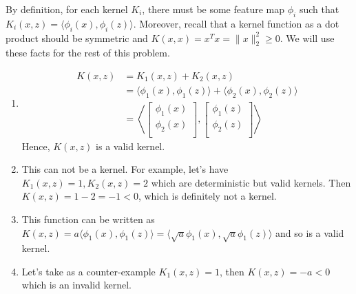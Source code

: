 \begin{answer}
By definition, for each kernel $K_i$, there must be some feature map $\phi_i$ 
such that $K_i(x, z) = \langle \phi_i (x), \phi_i (z) \rangle$. Moreover, 
recall that a kernel function as a dot product should be symmetric and $K(x,x) 
= x^{T}x = \|x\|_{2}^{2} \ge 0$. We will use these facts for the rest of this 
problem. 
\begin{enumerate}
\item 
\begin{align}
	K(x, z) 
	&= K_{1}(x, z) + K_{2}(x, z) \\
	&= \langle \phi_{1}(x), \phi_{1}(z) \rangle + \langle \phi_{2}(x), 
	\phi_{2}(z) \rangle \\
	&= \left\langle \begin{bmatrix}
		\phi_{1}(x) \\
		\phi_{2}(x) \\
	\end{bmatrix}, 
	 \begin{bmatrix}
		\phi_{1}(z) \\
		\phi_{2}(z) \\
	\end{bmatrix} \right\rangle
\end{align}
Hence, $K(x,z)$ is a valid kernel.

\item This can not be a kernel. For example, let's have $K_{1}(x,z)=1, K_{2}(x,z)=2$ which are deterministic but valid kernels. Then $K(x,z) = 1-2 = -1 < 0$, which is definitely not a kernel.

\item This function can be written as $K(x,z) = a 
\langle\phi_1(x),\phi_1(z)\rangle = \langle\sqrt{a}\phi_1(x),\sqrt{a}\phi_1(z)\rangle$ 
and so is a valid kernel.

\item Let's take as a counter-example $K_1(x,z)=1$, then $K(x,z) = -a < 0$ which is an 
invalid kernel. 


\end{enumerate}
\end{answer}
